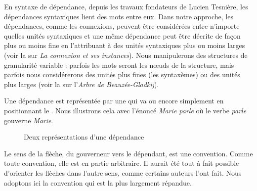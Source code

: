 En syntaxe de dépendance, depuis les travaux fondateurs de Lucien Tesnière, les dépendances syntaxiques lient des mots entre eux. Dans notre approche, les dépendances, comme les connexions, peuvent être considérées entre n’importe quelles unités syntaxiques et une même dépendance peut être décrite de façon plus ou moins fine en l’attribuant à des unités syntaxiques plus ou moins larges (voir la  sur \textit{La connexion et ses instances}). Nous manipulerons des structures de granularité variable : parfois les mots seront les nœuds de la structure, mais parfois nous considérerons des unités plus fines (les syntaxèmes) ou des unités plus larges (voir la  sur l’\textit{Arbre de Beauzée-Gladkij}).

Une dépendance est représentée par une  qui va  ou encore simplement en positionnant le . Nous illustrons cela avec l’énoncé \textit{Marie parle} où le verbe \textit{parle} gouverne \textit{Marie}.

\begin{figure}
\hspace{2cm}
\caption{Deux représentations d’une dépendance}
\end{figure}

Le sens de la flèche, du gouverneur vers le dépendant, est une convention. Comme toute convention, elle est en partie arbitraire. Il aurait été tout à fait possible d’orienter les flèches dans l’autre sens, comme certains auteurs l’ont fait. Nous adoptons ici la convention qui est la plus largement répandue.

